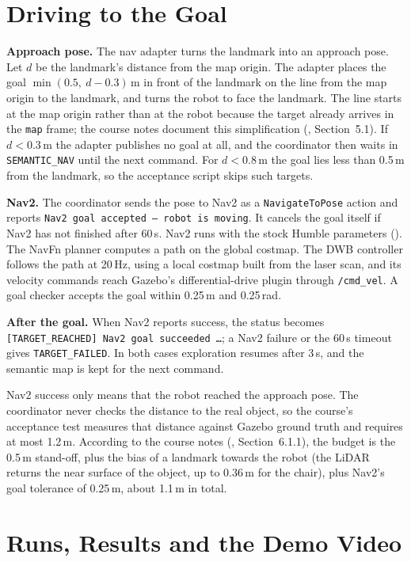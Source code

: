 \documentclass[11pt]{article}
\begin{document}
\section{Driving to the Goal}
\label{sec:nav}

\textbf{Approach pose.} The nav adapter turns the landmark into an approach pose. Let $d$ be the landmark's distance from the map origin. The adapter places the goal $\min(0.5,\ d-0.3)$\,m in front of the landmark on the line from the map origin to the landmark, and turns the robot to face the landmark. The line starts at the map origin rather than at the robot because the target already arrives in the \texttt{map} frame; the course notes document this simplification (, Section~5.1). If $d<0.3$\,m the adapter publishes no goal at all, and the coordinator then waits in \texttt{SEMANTIC\_NAV} until the next command. For $d<0.8$\,m the goal lies less than 0.5\,m from the landmark, so the acceptance script skips such targets.

\textbf{Nav2.} The coordinator sends the pose to Nav2 as a \texttt{NavigateToPose} action and reports \texttt{Nav2 goal accepted -- robot is moving}. It cancels the goal itself if Nav2 has not finished after 60\,s. Nav2 runs with the stock Humble parameters (). The NavFn planner computes a path on the global costmap. The DWB controller follows the path at 20\,Hz, using a local costmap built from the laser scan, and its velocity commands reach Gazebo's differential-drive plugin through \texttt{/cmd\_vel}. A goal checker accepts the goal within 0.25\,m and 0.25\,rad.

\textbf{After the goal.} When Nav2 reports success, the status becomes \texttt{[TARGET\_REACHED] Nav2 goal succeeded \ldots}; a Nav2 failure or the 60\,s timeout gives \texttt{TARGET\_FAILED}. In both cases exploration resumes after 3\,s, and the semantic map is kept for the next command.

Nav2 success only means that the robot reached the approach pose. The coordinator never checks the distance to the real object, so the course's acceptance test measures that distance against Gazebo ground truth and requires at most 1.2\,m. According to the course notes (, Section~6.1.1), the budget is the 0.5\,m stand-off, plus the bias of a landmark towards the robot (the LiDAR returns the near surface of the object, up to 0.36\,m for the chair), plus Nav2's goal tolerance of 0.25\,m, about 1.1\,m in total.

\section{Runs, Results and the Demo Video}
\label{sec:results}
\end{document}
